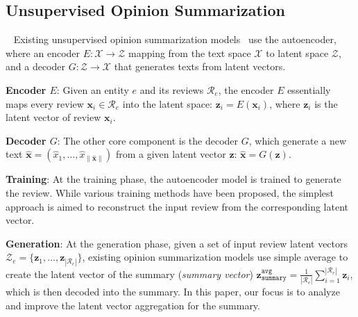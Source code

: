 \documentclass[11pt]{article}
\begin{document}
\subsection{Unsupervised Opinion Summarization}~\label{sec:method}
Existing unsupervised opinion summarization models~\cite{Chu:2019:MeanSum, brazinskas-etal-2020-unsupervised} use the autoencoder, where an encoder $E: \mathcal{X} \xrightarrow{} \mathcal{Z}$ mapping from the text space $\mathcal{X}$ to latent space $\mathcal{Z}$, and a decoder $G: \mathcal{Z} \xrightarrow{} \mathcal{X}$ that generates texts from latent vectors.

\noindent
{\bf Encoder $E$}: Given an entity $e$ and its reviews $\mathcal{R}_e$, the encoder $E$ essentially maps every review $\boldsymbol{x}_i \in \mathcal{R}_e$ into the latent space: $\boldsymbol{z}_i = E(\boldsymbol{x}_i)$, where $\boldsymbol{z}_i$ is the latent vector of review $\boldsymbol{x}_i$.

\noindent
{\bf Decoder $G$}: The other core component is the decoder $G$, which generate a new text $\boldsymbol{\hat{x}} = (\hat{x}_1, ..., \hat{x}_{\|\boldsymbol{\hat{x}}\|})$ from a given latent vector $\boldsymbol{z}$: $\boldsymbol{\hat{x}} = G(\boldsymbol{z})$.

\noindent
{\bf Training}: At the training phase, the autoencoder model is trained to generate the review. While various training methods have been proposed, the simplest approach is aimed to reconstruct the input review from the corresponding latent vector.

\noindent
{\bf Generation}: At the generation phase, given a set of input review latent vectors $\mathcal{Z}_e = \{\boldsymbol{z}_1, ..., \boldsymbol{z}_{|\mathcal{R}_e|}\}$, existing opinion summarization models use simple average to create the latent vector of the summary ({\em summary vector}) 
$\boldsymbol{z}_{\texttt{summary}}^{\texttt{avg}} = \frac{1}{|\mathcal{R}_e|} \sum_{i = 1}^{|\mathcal{R}_e|} \boldsymbol{z}_i$, which is then decoded into the summary. In this paper, our focus is to analyze and improve the latent vector aggregation for the summary.
\end{document}
